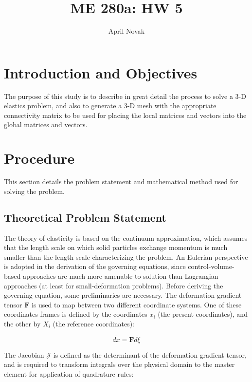 \documentclass[10pt]{article}
\begin{document}
\title{ME 280a: HW 5}
\author{April Novak}

\maketitle

\section{Introduction and Objectives}

The purpose of this study is to describe in great detail the process to solve a 3-D elastics problem, and also to generate a 3-D mesh with the appropriate connectivity matrix to be used for placing the local matrices and vectors into the global matrices and vectors.

\section{Procedure}
\label{sec:Procedure}

This section details the problem statement and mathematical method used for solving the problem.

\subsection{Theoretical Problem Statement}

The theory of elasticity is based on the continuum approximation, which assumes that the length scale on which solid particles exchange momentum is much smaller than the length scale characterizing the problem. An Eulerian perspective is adopted in the derivation of the governing equations, since control-volume-based approaches are much more amenable to solution than Lagrangian approaches (at least for small-deformation problems). Before deriving the governing equation, some preliminaries are necessary. The deformation gradient tensor \(\textbf{F}\) is used to map between two different coordinate systems. One of these coordinates frames is defined by the coordinates \(x_i\) (the present coordinates), and the other by \(X_i\) (the reference coordinates):

\begin{equation}
\label{eq:DeformationGradient}
\bar{dx}=\textbf{F}\bar{d\xi}
\end{equation}

The Jacobian \(\mathscr{J}\) is defined as the determinant of the deformation gradient tensor, and is required to transform integrals over the physical domain to the master element for application of quadrature rules:
\end{document}
